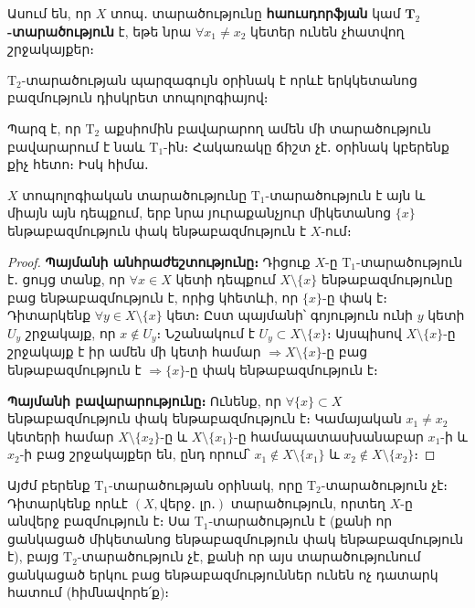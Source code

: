 \documentclass[./main.tex]{subfiles}
\begin{document}
\begin{definition} Ասում են, որ $X$ տոպ․ տարածությունը \textbf{հաուսդորֆյան} կամ $\textbf{T}_2$\textbf{-տարածություն} է, եթե նրա $\forall x_1 \neq x_2$ կետեր ունեն չհատվող շրջակայքեր։
\end{definition} 
$\textrm{T}_2$-տարածության պարզագույն օրինակ է որևէ երկկետանոց բազմություն դիսկ\-րետ տոպոլոգիայով։
\par Պարզ է, որ $\textrm{T}_2$ աքսիոմին բավարարող ամեն մի տարածություն բավարարում է նաև $\textrm{T}_1$-ին։ Հակառակը ճիշտ չէ․ օրինակ կբերենք քիչ հետո։ Իսկ հիմա․

\begin{theorem}\label{ch5thm4}
$X$ տոպոլոգիական տարածությունը $\textrm{T}_1$-տարածություն է այն և միայն այն դեպքում, երբ նրա յուրաքանչյուր միկետանոց $\{x\}$ ենթա\-բազ\-մություն փակ ենթաբազմություն է $X$-ում։
\end{theorem} 

\begin{proof} \textbf{Պայմանի անհրաժեշտությունը։} Դիցուք $X$-ը $\textrm{T}_1$-տարածություն է․ ցույց տանք, որ $\forall x \in X$ կետի դեպքում $X \setminus \{x\}$ ենթաբազմությունը բաց են\-թա\-բազ\-մութ\-յուն է, որից կհետևի, որ $\{x\}$-ը փակ է։ Դիտարկենք $\forall y \in X \setminus \{x\}$ կետ։ Ըստ պայմանի՝ գոյություն ունի $y$ կետի $U_y$ շրջակայք, որ $x \notin U_y$։  Նշանակում է $U_y \subset X \setminus \{x\}$։ Այսպիսով $X \setminus \{x\}$-ը շրջակայք է իր ամեն մի կետի համար $\Rightarrow X \setminus \{x\}\textrm{-ը}$ բաց ենթաբազմություն է $\Rightarrow \{x\}$-ը փակ ենթաբազմություն է։

\textbf{Պայմանի բավարարությունը։} Ունենք, որ $\forall \{x\} \subset X$ ենթաբազմություն փակ ենթաբազմություն է։ Կամայական $x_1 \neq x_2$ կետերի համար $X \setminus \{x_2\}$-ը և $X \setminus \{x_1\}$-ը համապատասխանաբար $x_1$-ի և $x_2$-ի բաց շրջակայքեր են, ընդ որում՝ $x_1 \notin X \setminus \{x_1\}$ և $x_2 \notin X \setminus \{x_2\}$։
\end{proof}

\par Այժմ բերենք $\textrm{T}_1$-տարածության օրինակ, որը $\textrm{T}_2$-տարածություն չէ։ Դիտարկենք որևէ $(X, \textrm{վերջ․ լր․})$ տարածություն, որտեղ $X$-ը անվերջ բազմություն է։ Սա $\textrm{T}_1$-տարա\-ծու\-թյուն է (քանի որ ցանկացած միկետանոց ենթաբազմություն փակ ենթա\-բազ\-մու\-թյուն է), բայց $\textrm{T}_2$-տարածություն չէ, քանի որ այս տարածությունում ցանկա\-ցած երկու բաց ենթաբազմություններ ունեն ոչ դատարկ հատում (հիմ\-նա\-վո\-րե՛ք)։
\end{document}
